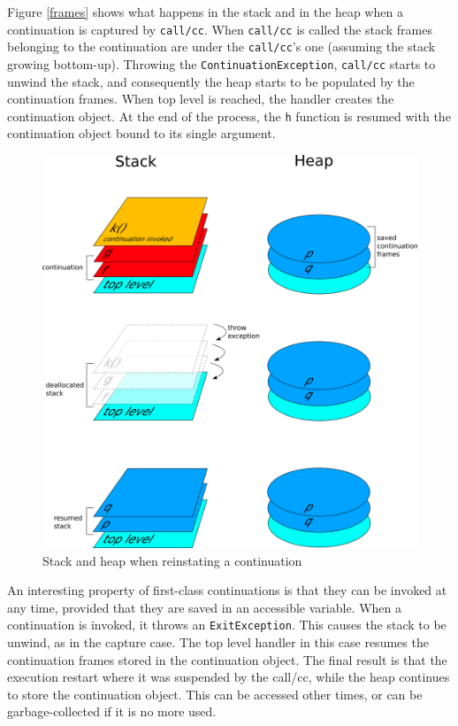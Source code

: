 \documentclass[12pt,a4paper,oneside,openright]{book}
\begin{document}
Figure \ref{frames} shows what happens in the stack and in the heap when
a continuation is captured by \texttt{call/cc}. When \texttt{call/cc} is
called the stack frames belonging to the continuation are under the
\texttt{call/cc}'s one (assuming the stack growing bottom-up). Throwing
the \texttt{ContinuationException}, \texttt{call/cc} starts to unwind
the stack, and consequently the heap starts to be populated by the
continuation frames. When top level is reached, the handler creates the
continuation object. At the end of the process, the \texttt{h} function
is resumed with the continuation object bound to its single argument.

\begin{figure}[htbp]
\centering
\includegraphics{figures/frames-call.png}
\caption{Stack and heap when reinstating a continuation
\label{frames-call}}
\end{figure}

An interesting property of first-class continuations is that they can be
invoked at any time, provided that they are saved in an accessible
variable. When a continuation is invoked, it throws an
\texttt{ExitException}. This causes the stack to be unwind, as in the
capture case. The top level handler in this case resumes the
continuation frames stored in the continuation object. The final result
is that the execution restart where it was suspended by the call/cc,
while the heap continues to store the continuation object. This can be
accessed other times, or can be garbage-collected if it is no more used.
\end{document}
